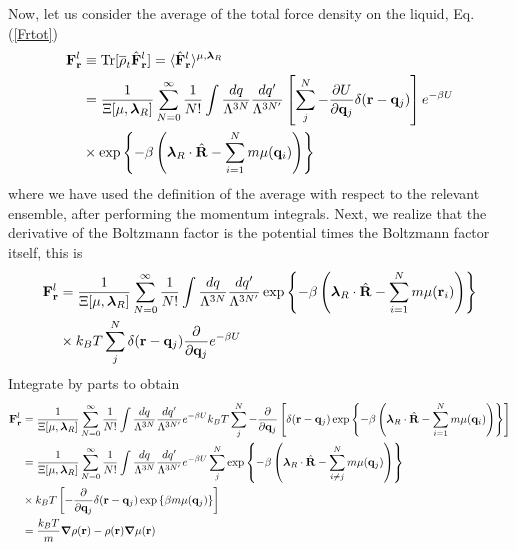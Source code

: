 \documentclass[b5paper,openright,11pt]{book}
\begin{document}
Now, let us consider the average of the total force density on the liquid, Eq. (\ref{Frtot})
\begin{align}
{\bf F}^l_{\bf r} &\equiv{\rm Tr}[\overline{\rho}_t \hat{\bf F}^l_{\bf r}] =
 \langle \hat{\bf F}^l_{\bf r}\rangle^{\mu,\boldsymbol{\lambda}_R}
\nonumber\\
&=
\frac{1}{\Xi[\mu,\boldsymbol{\lambda}_R]}
 \sum_{N=0}^\infty \frac{1}{N!}
\int \frac{dq}{\Lambda^{3N}}\frac{dq'}{\Lambda^{3N'}}
\left[\sum^{N}_{j}-\frac{\partial U}{\partial {\bf q}_{j}}\delta({\bf r}-{\bf q}_j)\right]
e^{-\beta U}
\nonumber\\
&\times \exp\left\{-\beta  \left( \boldsymbol{\lambda}_R\cdot\hat{\bf R}
-\sum_{i=1}^N m\mu({\bf q}_i)\right)\right\}
\end{align}
where we have  used the definition of the average  with respect to the
relevant ensemble,  after performing the momentum  integrals. Next, we
realize that the  derivative of the Boltzmann factor  is the potential
times the Boltzmann factor itself, this is
\begin{align}
{\bf F}^l_{\bf r}&=
\frac{1}{\Xi[\mu,\boldsymbol{\lambda}_R]}
 \sum_{N=0}^\infty \frac{1}{N!}
\int \frac{dq}{\Lambda^{3N}}\frac{dq'}{\Lambda^{3N'}}
\exp\left\{-\beta  \left(\boldsymbol{\lambda}_R\cdot\hat{\bf R}
-\sum_{i=1}^N m\mu({\bf   r}_i)\right)\right\}
\nonumber\\
&\times k_BT\sum^{N}_{j}\delta({\bf r}-{\bf q}_j)\frac{\partial }{\partial {\bf q}_{j}}e^{-\beta U}
\end{align}
Integrate by parts to obtain
\begin{align}
{\bf F}^l_{\bf r}&=
\frac{1}{\Xi[\mu,\boldsymbol{\lambda}_R]}
 \sum_{N=0}^\infty \frac{1}{N!}
\int \frac{dq}{\Lambda^{3N}}\frac{dq'}{\Lambda^{3N'}}
e^{-\beta U}
k_BT\sum^{N}_{j}-\frac{\partial }{\partial {\bf q}_{j}}\left[\delta({\bf r}-{\bf q}_j)
\exp\left\{-\beta  \left( \boldsymbol{\lambda}_R\cdot\hat{\bf R}
-\sum_{i=1}^N m\mu({\bf q}_i)\right)\right\}\right]
\nonumber\\
&=
\frac{1}{\Xi[\mu,\boldsymbol{\lambda}_R]}
 \sum_{N=0}^\infty \frac{1}{N!}
\int \frac{dq}{\Lambda^{3N}}\frac{dq'}{\Lambda^{3N'}}
e^{-\beta U}
\sum^{N}_{j}\exp\left\{-\beta  \left( \boldsymbol{\lambda}_R\cdot\hat{\bf R}
-\sum_{i\neq j}^N m\mu({\bf   q}_j)\right)\right\}
\nonumber\\
&\times k_BT\left[-\frac{\partial }{\partial {\bf q}_{j}}\delta({\bf r}-{\bf q}_j)
\exp\left\{\beta   m\mu({\bf   q}_j)\right\}\right]
\nonumber\\
&=\frac{k_BT}{m}\boldsymbol{\nabla} \rho({\bf r})
-\rho({\bf r})\boldsymbol{\nabla}\mu({\bf r})
\label{fllr}
\end{align}
\end{document}
